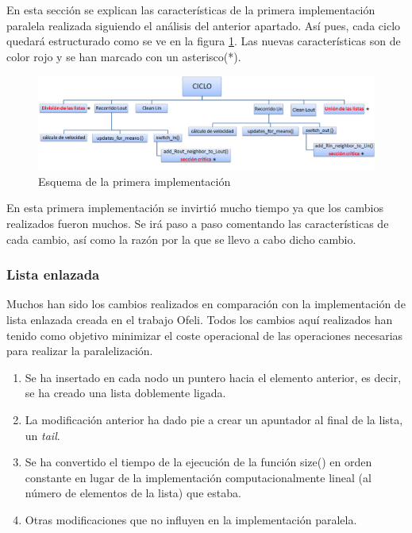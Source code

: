 En esta secci\'{o}n se explican las caracter\'{i}sticas de la primera implementaci\'{o}n paralela realizada siguiendo el an\'{a}lisis del anterior apartado. As\'{i} pues, cada ciclo quedar\'{a} estructurado como se ve en la figura \ref{1-Imple}. Las nuevas caracter\'{i}sticas son de color rojo y se han marcado con un asterisco(*). 

 \begin{figure}[H]
 	\captionsetup{justification=centering}
 	\centering
 	\includegraphics[width=1.2\textwidth]{./imagenes/1-Imple}
 	\caption{Esquema de la primera implementaci\'{o}n}	
 	\label{1-Imple}
 \end{figure}

En esta primera implementaci\'{o}n se invirti\'{o} mucho tiempo ya que los cambios realizados fueron muchos. Se ir\'{a} paso a paso comentando las caracter\'{i}sticas de cada cambio, as\'{i} como la raz\'{o}n por la que se llevo a cabo dicho cambio.

\subsubsection{Lista enlazada}

Muchos han sido los cambios realizados en comparaci\'{o}n con la implementaci\'{o}n de lista enlazada creada en el trabajo Ofeli. Todos los cambios aqu\'{i} realizados han tenido como objetivo minimizar el coste operacional de las operaciones necesarias para realizar la paralelizaci\'{o}n. 

\begin{enumerate}
	\item Se ha insertado en cada nodo un puntero hacia el elemento anterior, es decir, se ha creado una lista doblemente ligada. 
	\item La modificaci\'{o}n anterior ha dado pie a crear un apuntador al final de la lista, un \textit{tail}.
	\item Se ha convertido el tiempo de la ejecuci\'{o}n de la funci\'{o}n size() en orden constante en lugar de la implementaci\'{o}n computacionalmente lineal (al n\'{u}mero de elementos de la lista) que estaba.
	\item Otras modificaciones que no influyen en la implementaci\'{o}n paralela.
\end{enumerate}


